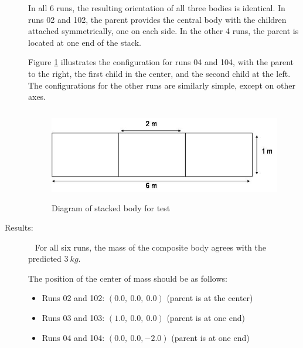\begin{description}
In all 6 runs, the resulting orientation of all three bodies is identical.  In 
runs 02 and 102, the parent provides the central body with the children 
attached symmetrically, one on each side.  In the other 4 runs, the parent is 
located at one end of the stack.

Figure \ref{3_stack_z} illustrates the configuration for runs 04 and 104, with 
the parent to the right, the first child in the center, and the second child 
at the left.  The configurations for the other runs are similarly simple, 
except on other axes.


\begin{figure}[h]
\begin{center}
\includegraphics[height=40mm]{pics/stack_z.jpg}
\caption{Diagram of stacked body for test}
\label{3_stack_z}
\end{center}
\end{figure}

\item[Results:]\ \newline
For all six runs, the mass of the composite body agrees with the predicted $3~ 
kg$.

The position of the center of mass should be as follows:
\begin{itemize}
 \item Runs 02 and 102:  $(0.0,~0.0,~0.0)$ (parent is at the center)
 \item Runs 03 and 103:  $(1.0,~0.0,~0.0)$ (parent is at one end)
 \item Runs 04 and 104:  $(0.0,~0.0,-2.0)$ (parent is at one end)
\end{itemize}


\end{description}
